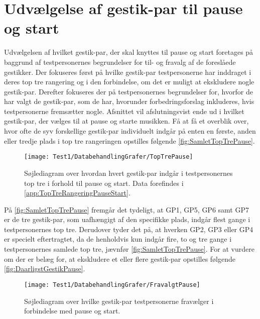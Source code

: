 \section{Udvælgelse af gestik-par til pause og start}
\label{TestresultaterPauseStart}
%
Udvælgelsen af hvilket gestik-par, der skal knyttes til pause og start foretages på baggrund af testpersonernes begrundelser for til- og fravalg af de foreslåede gestikker. Der fokuseres først på hvilke gestik-par testpersonerne har inddraget i deres top tre rangering og i den forbindelse, om det er muligt at ekskludere nogle gestik-par. Derefter fokuseres der på testpersonernes begrundelser for, hvorfor de har valgt de gestik-par, som de har, hvorunder forbedringsforslag inkluderes, hvis testpersonerne fremsætter nogle. Afsnittet vil afslutningsvist ende ud i hvilket gestik-par, der vælges til at pause og starte musikken.\blankline
%
Få at få et overblik over, hvor ofte de syv forskellige gestik-par individuelt indgår på enten en første, anden eller tredje plads i top tre rangeringen opstilles følgende \autoref{fig:SamletTopTrePause}. 
%
\begin{figure}[H]
	\centering
	\texttt{[image: Test1/DatabehandlingGrafer/TopTrePause]}
	\caption{Søjlediagram over hvordan hvert gestik-par indgår i testpersonernes top tre i forhold til pause og start. Data forefindes i \autoref{app:TopTreRangeringPauseStart}.}
	\label{fig:SamletTopTrePause}
\end{figure}
\noindent
% 
På \autoref{fig:SamletTopTrePause} fremgår det tydeligt, at GP1, GP5, GP6 samt GP7 er de tre gestik-par, som uafhængigt af den specifikke plads, indgår flest gange i testpersonernes top tre. Derudover tyder det på, at hverken GP2, GP3 eller GP4 er specielt eftertragtet, da de henholdvis kun indgår fire, to og tre gange i testpersonernes samlede top tre, jævnfør \autoref{fig:SamletTopTrePause}. For at vurdere om der er belæg for, at ekskludere et eller flere gestik-par opstilles følgende \autoref{fig:DaarligstGestikPause}.  
%
\begin{figure}[H]
	\centering
	\texttt{[image: Test1/DatabehandlingGrafer/FravalgtPause]}
	\caption{Søjlediagram over hvilke gestik-par testpersonerne fravælger i forbindelse med pause og start.}
	\label{fig:DaarligstGestikPause}
\end{figure}
\noindent
%
